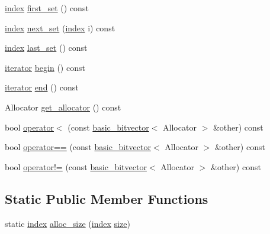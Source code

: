 \begin{DoxyCompactItemize}
\item 
\hyperlink{namespaceterraces_adbc33ccb543d1634e96d0eb02e472c77}{index} \hyperlink{classterraces_1_1basic__bitvector_a43d7e193d6ce2d937039af566f480a74}{first\+\_\+set} () const
\item 
\hyperlink{namespaceterraces_adbc33ccb543d1634e96d0eb02e472c77}{index} \hyperlink{classterraces_1_1basic__bitvector_a21edd3eed32e2c09950d137987457078}{next\+\_\+set} (\hyperlink{namespaceterraces_adbc33ccb543d1634e96d0eb02e472c77}{index} i) const
\item 
\hyperlink{namespaceterraces_adbc33ccb543d1634e96d0eb02e472c77}{index} \hyperlink{classterraces_1_1basic__bitvector_aac46a6f2e72007dc5508f4f3855e236e}{last\+\_\+set} () const
\item 
\hyperlink{classterraces_1_1basic__bitvector_aff8b2ad5a1518f6d8b157df0d2f77bdd}{iterator} \hyperlink{classterraces_1_1basic__bitvector_a205a9008238b8ed80f126230d80a08f3}{begin} () const
\item 
\hyperlink{classterraces_1_1basic__bitvector_aff8b2ad5a1518f6d8b157df0d2f77bdd}{iterator} \hyperlink{classterraces_1_1basic__bitvector_aab7b24b23810e5eda52a99145057d75d}{end} () const
\item 
Allocator \hyperlink{classterraces_1_1basic__bitvector_a50cd443a48618a59a130b0325e75eac4}{get\+\_\+allocator} () const
\item 
bool \hyperlink{classterraces_1_1basic__bitvector_ac09540b4ecb00339e8a9b6a44e1711e3}{operator$<$} (const \hyperlink{classterraces_1_1basic__bitvector}{basic\+\_\+bitvector}$<$ Allocator $>$ \&other) const
\item 
bool \hyperlink{classterraces_1_1basic__bitvector_ad4299081f5f8a3d3d16b662941801400}{operator==} (const \hyperlink{classterraces_1_1basic__bitvector}{basic\+\_\+bitvector}$<$ Allocator $>$ \&other) const
\item 
bool \hyperlink{classterraces_1_1basic__bitvector_a6821bf429f6a9b60065c6e61faadb333}{operator!=} (const \hyperlink{classterraces_1_1basic__bitvector}{basic\+\_\+bitvector}$<$ Allocator $>$ \&other) const
\end{DoxyCompactItemize}
\subsection*{Static Public Member Functions}
\begin{DoxyCompactItemize}
\item 
static \hyperlink{namespaceterraces_adbc33ccb543d1634e96d0eb02e472c77}{index} \hyperlink{classterraces_1_1basic__bitvector_a2256081065bc6537e467f437cfdbef5c}{alloc\+\_\+size} (\hyperlink{namespaceterraces_adbc33ccb543d1634e96d0eb02e472c77}{index} \hyperlink{classterraces_1_1basic__bitvector_a7a846347ea4c1c1f542ff3331307fdb9}{size})
\end{DoxyCompactItemize}
